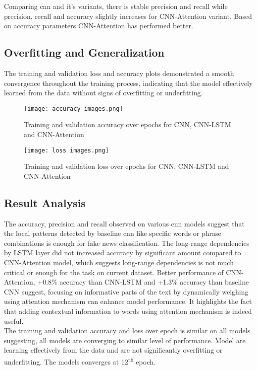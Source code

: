 Comparing \ac{cnn} and it's variants, there is stable precision and recall while precision, recall and accuracy slightly increases for CNN-Attention variant. Based on accuracy parameters CNN-Attention has performed better.
\clearpage

\subsection{Overfitting and Generalization} 
The training and validation loss and accuracy plots demonstrated a smooth convergence throughout the training process, indicating that the model effectively learned from the data without signs of overfitting or underfitting.

\begin{figure}[h]
    \centering
    \texttt{[image: accuracy images.png]}
    \caption{Training and validation accuracy over epochs for CNN, CNN-LSTM and CNN-Attention}  
\end{figure}

\begin{figure}[h]
    \centering
    \texttt{[image: loss images.png]}
    \caption{Training and validation loss over epochs for CNN, CNN-LSTM and CNN-Attention}   
\end{figure}
\clearpage
\subsection{Result Analysis}
The accuracy, precision and recall observed on various \ac{cnn} models suggest that the local patterns detected by baseline \ac{cnn} like specific words or phrase combinations is enough for fake news classification. The long-range dependencies by LSTM layer did not increased accuracy by significant amount compared to CNN-Attention model, which suggests long-range dependencies is not much critical or enough for the task on current dataset. Better performance of CNN-Attention, +0.8\% accuracy than CNN-LSTM and +1.3\% accuracy than baseline CNN suggest, focusing on informative parts of the text by dynamically weighing using attention mechanism can enhance model performance. It highlights the fact that adding contextual information to words using attention mechanism is indeed useful. \\

The training and validation accuracy and loss over epoch is similar on all models suggesting, all models are converging to similar level of performance. Model are learning effectively from the data and are not significantly overfitting or underfitting. The models converges at 12\textsuperscript{th} epoch.

